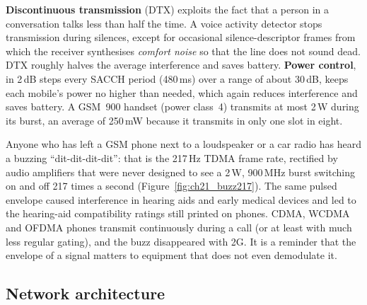 \textbf{Discontinuous transmission} (DTX) exploits the fact that a
person in a conversation talks less than half the time. A voice activity detector stops
transmission during silences, except for occasional silence-descriptor frames from which the
receiver synthesises \emph{comfort noise} so that the line does not sound dead. DTX roughly halves
the average interference and saves battery. \textbf{Power control}, in 2\,dB
steps every SACCH period (480\,ms) over a range of about 30\,dB, keeps each mobile's power no higher
than needed, which again reduces interference and saves battery. A GSM~900 handset (power class~4)
transmits at most 2\,W during its burst, an average of 250\,mW because it transmits in only one slot
in eight.

\begin{inpractice}
Anyone who has left a GSM phone next to a loudspeaker or a car radio has heard a buzzing
``dit-dit-dit-dit'': that is the 217\,Hz TDMA frame rate, rectified by audio amplifiers that were
never designed to see a 2\,W, 900\,MHz burst switching on and off 217 times a second
(Figure~\ref{fig:ch21_buzz217}). The same pulsed envelope caused interference in hearing aids and
early medical devices and led to the hearing-aid compatibility ratings still printed on phones.
CDMA, WCDMA and OFDMA phones transmit continuously during a call (or at least with much less regular
gating), and the buzz disappeared with 2G. It is a reminder that the envelope of a signal matters to
equipment that does not even demodulate it.
\end{inpractice}


\subsection{Network architecture}

